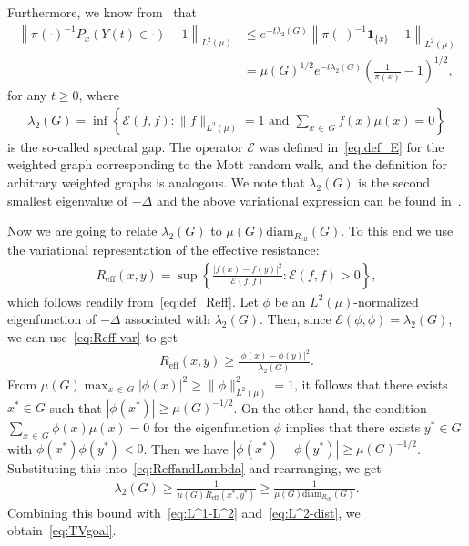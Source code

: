 \documentclass[AHL,Unicode,longabstracts,published]{cedram}
\newcommand{\clE}{\mathcal{E}}
\newcommand{\bfun}{\mathbf{1}}
\begin{document}
Furthermore, we know from~\cite[Corollary~5.9]{Barbook} that
\begin{equation}\label{eq:L^2-dist}
\begin{split}
\left\|\pi(\cdot)^{-1}P_x(Y(t)\in\cdot)-1\right\|_{L^2(\mu)} &\le e^{-t \lambda_2(G)} \left\|\pi(\cdot)^{-1}\bfun_{\{x\}}-1\right\|_{L^2(\mu)}\\
&= \mu(G)^{1/2}e^{-t\lambda_2(G)}\left(\frac{1}{\pi(x)}-1\right)^{1/2},
\end{split}
\end{equation}
for any $t\ge 0$, where
\begin{align*}
\lambda_2(G)=\inf\left\{\clE(f,f)\colon \|f\|_{L^2(\mu)}=1 \text{ and }\sum_{x\,\in\,G}f(x)\mu(x) =0\right\}
\end{align*}
is the so-called spectral gap. The operator $\clE$ was defined in~\eqref{eq:def_E} for the weighted graph corresponding to the Mott random walk, and the definition for arbitrary weighted graphs is analogous. We note that $\lambda_2(G)$ is the second smallest eigenvalue of $-\Delta$ and the above variational expression can be found in~\cite[Lemma~3.36]{Barbook}.

Now we are going to relate $\lambda_2(G)$ to $\mu(G)\text{diam}_{R_{\text{eff}}}(G)$. To this end we use the variational representation of the effective resistance:
\begin{align}\label{eq:Reff-var}
R_{\text{eff}}(x,y)=\sup\left\{\frac{\left|f(x)-f(y)\right|^2}{\clE(f,f)}\colon \clE(f,f)>0\right\},
\end{align}
which follows readily from~\eqref{eq:def_Reff}. Let $\phi$ be an $L^2(\mu)$-normalized eigenfunction of $-\Delta$ associated with $\lambda_2(G)$. Then, since $\clE(\phi,\phi)=\lambda_2(G)$, we can use~\eqref{eq:Reff-var} to get
\begin{align}\label{eq:ReffandLambda}
R_{\text{eff}}(x,y)\ge \frac{\left|\phi(x)-\phi(y)\right|^2}{\lambda_2(G)}.
\end{align}
From $\mu(G)\max_{x\,\in\,G}|\phi(x)|^2\ge\|\phi\|_{L^2(\mu)}^2=1$, it follows that there exists $x^*\in G$ such that $|\phi(x^*)|\ge \mu(G)^{-1/2}$. On the other hand, the condition $\sum_{x\,\in\,G} \phi(x)\mu(x)=0$ for the eigenfunction $\phi$ implies that there exists $y^*\in G$ with $\phi(x^*)\phi(y^*)<0$. Then we have $|\phi(x^*)-\phi(y^*)|\ge \mu(G)^{-1/2}$. Substituting this into~\eqref{eq:ReffandLambda} and rearranging, we get
\begin{align*}
\lambda_2(G)\ge \frac{1}{\mu(G) R_{\text{eff}}(x^*,y^*)} \ge \frac{1}{\mu(G)\text{diam}_{R_{\text{eff}}}(G)}.
\end{align*}
Combining this bound with~\eqref{eq:L^1-L^2} and~\eqref{eq:L^2-dist}, we obtain~\eqref{eq:TVgoal}.




\end{document}

